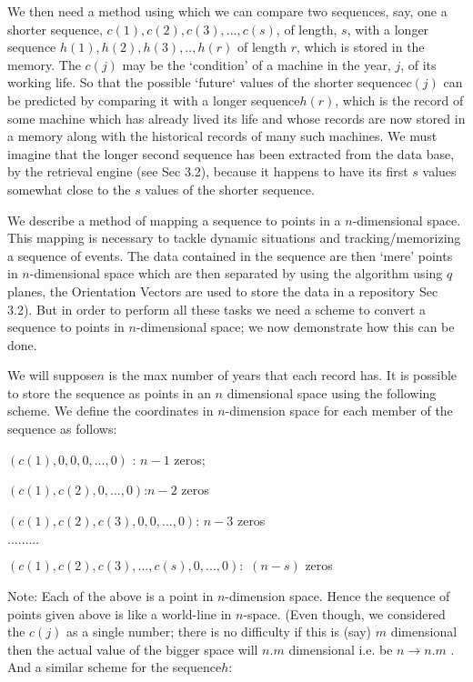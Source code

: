 \documentclass[english]{article}
\begin{document}
We then need a method using which we can compare two sequences, say,
one a shorter sequence, $c(1),c(2),c(3),...,c(s)$,
of length, $s$, with a longer sequence $h(1),h(2),h(3),..,h(r)$
of length $r$, which is stored in the memory. The $c(j)$ may be
the `condition\textquoteright{} of a machine in the year, $j$, of
its working life. So that the possible `future` values of the shorter
sequence$c(j)$ can be predicted by comparing it with a longer sequence$h(r)$,
which is the record of some machine which has already lived its life
and whose records are now stored in a memory along with the historical
records of many such machines. We must imagine that the longer second
sequence has been extracted from the data base, by the retrieval engine
(see Sec 3.2), because it happens to have its first $s$ values somewhat
close to the $s$ values of the shorter sequence. 

\medskip{}


We describe a method of mapping a sequence to points in a $n$-dimensional
space. This mapping is necessary to tackle dynamic situations and
tracking/memorizing a sequence of events. The data contained in the
sequence are then `mere\textquoteright{} points in $n$-dimensional
space which are then separated by using the algorithm using $q$ planes,
the Orientation Vectors are used to store the data in a repository
Sec 3.2). But in order to perform all these tasks we need a scheme
to convert a sequence to points in $n$-dimensional space; we now
demonstrate how this can be done. 

We will suppose$n$ is the max number of years that each record has.
It is possible to store the sequence as points in an $n$ dimensional
space using the following scheme. We define the coordinates in $n$-dimension
space for each member of the sequence as follows:

$(c(1),0,0,0,...,0)$ : \qquad{}\qquad{}$n-1$ zeros;

$(c(1),c(2),0,...,0)$:\qquad{}\qquad{}$n-2$ zeros

$(c(1),c(2),c(3),0,0,...,0)$: \qquad{}\qquad{} $n-3$ zeros 

$.........$

$(c(1),c(2),c(3),...,c(s),0,...,0):$ \qquad{}\qquad{}$(n-s)$ zeros 

\medskip{}


Note: Each of the above is a point in $n$-dimension space. Hence
the sequence of points given above is like a world-line in $n$-space.
(Even though, we considered the $c(j)$ as a single number; there
is no difficulty if this is (say) $m$ dimensional \textendash{} then
the actual value of the bigger space will $n.m$ dimensional i.e.
be $n\rightarrow n.m$ . And a similar scheme for the sequence$h$:
\end{document}
